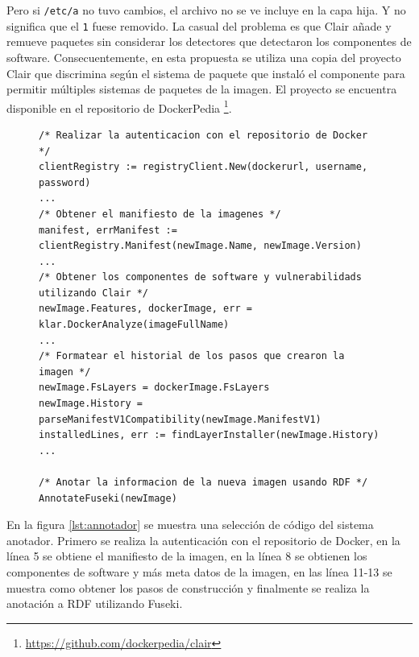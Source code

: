 Pero si \verb|/etc/a| no tuvo cambios, el archivo no se ve incluye en la capa hija. Y no significa que el \verb|1| fuese removido. 
La casual del problema es que Clair añade y remueve paquetes sin considerar los detectores que detectaron los componentes de software. 
Consecuentemente, en esta propuesta se utiliza una copia del proyecto Clair que discrimina según el sistema de paquete que instaló el componente para permitir múltiples sistemas de paquetes de la imagen. El proyecto se encuentra disponible en el repositorio de DockerPedia \footnote{\url{https://github.com/dockerpedia/clair}}.
\begin{figure}[h]
	\begin{lstlisting}[caption={Proceso de obtención de las descripciones},label={lst:annotador},language=GoLang]
/* Realizar la autenticacion con el repositorio de Docker */
clientRegistry := registryClient.New(dockerurl, username, password)
...
/* Obtener el manifiesto de la imagenes */
manifest, errManifest := clientRegistry.Manifest(newImage.Name, newImage.Version)
...
/* Obtener los componentes de software y vulnerabilidads utilizando Clair */
newImage.Features, dockerImage, err = klar.DockerAnalyze(imageFullName)
...
/* Formatear el historial de los pasos que crearon la imagen */
newImage.FsLayers = dockerImage.FsLayers
newImage.History = parseManifestV1Compatibility(newImage.ManifestV1)
installedLines, err := findLayerInstaller(newImage.History)
...

/* Anotar la informacion de la nueva imagen usando RDF */
AnnotateFuseki(newImage)
\end{lstlisting}
\end{figure}


En la figura \ref{lst:annotador} se muestra una selección de código del sistema anotador. Primero se realiza la autenticación con el repositorio de Docker, en la línea 5 se obtiene el manifiesto de la imagen, en la línea 8 se obtienen los componentes de software y más meta datos de la imagen, en las línea 11-13 se muestra como obtener los pasos de construcción y finalmente se realiza la anotación a RDF utilizando Fuseki.

